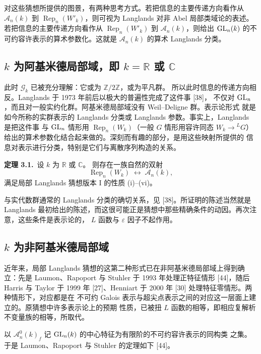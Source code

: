 对这些猜想所提供的图景，有两种思考方式。若把信息的主要传递方向看作从
$\mathcal{A}_n(k)$ 到 $\operatorname{Rep}_n(W'_k)$，则可视为 Langlands 对非 Abel
局部类域论的表述。若把信息的主要传递方向看作从 $\operatorname{Rep}_n(W'_k)$ 到
$\mathcal{A}_n(k)$，则给出 $\mathrm{GL}_n(k)$ 的不可约容许表示的算术参数化。这就是
$\mathcal{A}_n(k)$ 的算术 Langlands 分类。

\subsection{\texorpdfstring{$k$}{k} 为阿基米德局部域，即 \texorpdfstring{$k=\mathbb{R}$ 或 $\mathbb{C}$}{k=R 或 C}}

此时 $\mathcal{G}_k$ 已被充分理解：它或为 $\mathbb{Z}/2\mathbb{Z}$，或为平凡群。
所以此时信息的传递方向相反。Langlands 于 1973 年前后以极大的普遍性完成了这件事 [38]，
不仅对 $\mathrm{GL}_n$，而且对一般实约化群。阿基米德局部域没有 Weil--Deligne 群。表示论形式
就是如今所称的实群表示的 Langlands 分类或 Langlands 参数。事实上，Langlands 是把这件事
与 $\mathrm{GL}_n$ 情形用 $\operatorname{Rep}_n(W_k)$（一般 $G$ 情形用容许同态
$W_k\to{}^LG$）给出的算术参数化结合起来做的。深刻而有趣的部分，是用这些映射所提供的
信息对表示进行分类，特别是它们与离散序列构造的关系。

\par\medskip\noindent\textbf{定理 3.1.}\ 设 $k$ 为 $\mathbb{R}$ 或 $\mathbb{C}$。
则存在一族自然的双射
\[
  \operatorname{Rep}_n(W_k)\;\longleftrightarrow\;\mathcal{A}_n(k),
\]
满足局部 Langlands 猜想版本 I 的性质 (i)--(vi)。
\par\medskip

与实代数群通常的 Langlands 分类的确切关系，见 [38]。所证明的陈述当然就是 Langlands
最初给出的陈述，而这很可能正是猜想中那些精确条件的动因。再次注意，这些条件是表示论的，
$L$ 函数与 $\varepsilon$ 因子不起作用。

\subsection{\texorpdfstring{$k$}{k} 为非阿基米德局部域}

近年来，局部 Langlands 猜想的这第二种形式已在非阿基米德局部域上得到确立：先是
Laumon、Rapoport 与 Stuhler 于 1993 年处理正特征情形 [44]，随后 Harris 与 Taylor
于 1999 年 [27]、Henniart 于 2000 年 [30] 处理特征零情形。两种情形下，对应都是在
不可约 Galois 表示与超尖点表示之间的对应这一层面上建立的。原猜想中许多表示论上的预期
性质，已被扭 $L$ 函数的相等，即相应复解析不变量族的相等，所取代。

以 $\mathcal{A}_n^0(k)_f$ 记 $\mathrm{GL}_n(k)$ 的中心特征为有限阶的不可约容许表示的同构类
之集。于是 Laumon、Rapoport 与 Stuhler 的定理如下 [44]。

